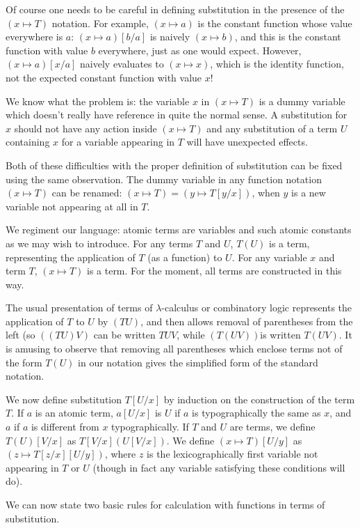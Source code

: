 \documentclass{article}
\begin{document}
Of course one needs to be careful in defining substitution in the presence
of the $(x \mapsto T)$ notation.  For example, $(x \mapsto a)$ is the constant
function whose value everywhere is $a$: $(x \mapsto a)[b/a]$ is naively
$(x \mapsto b)$, and this is the constant function with value $b$ everywhere,
just as one would expect.  However, $(x \mapsto a)[x/a]$ naively evaluates
to $(x \mapsto x)$, which is the identity function, not the expected constant
function with value $x$!

We know what the problem is:  the variable $x$ in $(x \mapsto T)$ is a dummy
variable which doesn't really have reference in quite the normal sense.  A
substitution for $x$ should not have any action inside $(x \mapsto T)$
and any substitution of a term $U$ containing $x$ for a variable appearing
in $T$ will have unexpected effects.

Both of these difficulties with the proper definition of substitution
can be fixed using the same observation.  The dummy variable in any
function notation $(x \mapsto T)$ can be renamed: $(x \mapsto T) = (y
\mapsto T[y/x])$, when $y$ is a new variable not appearing at all in
$T$.

We regiment our language:  atomic terms are variables and such atomic
constants as we may wish to introduce.  For any terms $T$ and $U$, $T(U)$
is a term, representing the application of $T$ (as a function) to $U$.
For any variable $x$ and term $T$, $(x \mapsto T)$ is a term.  For the moment,
all terms are constructed in this way.

The usual presentation of terms of $\lambda$-calculus or combinatory
logic represents the application of $T$ to $U$ by $(TU)$, and then
allows removal of parentheses from the left (so $((TU)V)$ can be
written $TUV$, while $(T(UV))$is written $T(UV)$.  It is amusing to
observe that removing all parentheses which enclose terms not of the
form $T(U)$ in our notation gives the simplified form of the standard
notation.

We now define substitution $T[U/x]$ by induction on the construction
of the term $T$.  If $a$ is an atomic term, $a[U/x]$ is $U$ if $a$ is
typographically the same as $x$, and $a$ if $a$ is different from $x$
typographically.  If $T$ and $U$ are terms, we define $T(U)[V/x]$ as
$T[V/x](U[V/x])$.  We define $(x \mapsto T)[U/y]$ as $(z \mapsto
T[z/x][U/y])$, where $z$ is the lexicographically first variable not
appearing in $T$ or $U$ (though in fact any variable satisfying these
conditions will do).

We can now state two basic rules for calculation with functions in terms
of substitution.
\end{document}

